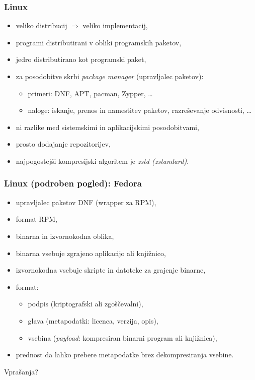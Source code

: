 \documentclass[aspectratio=169]{beamer}
\begin{document}
    \begin{frame}
        \frametitle{Linux}
        \begin{itemize}
            \item veliko distribucij \( \Rightarrow \) veliko implementacij,
            \item programi distributirani v obliki programskih paketov,
            \item jedro distributirano kot programski paket,
            \item za posodobitve skrbi \emph{package manager} (upravljalec paketov):
            \begin{itemize}
                \item primeri: DNF, APT, pacman, Zypper, \ldots
                \item naloge: iskanje, prenos in namestitev paketov, razreševanje odvisnosti, \ldots
            \end{itemize}
            \item ni razlike med sistemskimi in aplikacijskimi posodobitvami,
            \item prosto dodajanje repozitorijev,
            \item najpogostejši kompresijski algoritem je \emph{zstd (zstandard)}.
        \end{itemize}
    \end{frame}

    \begin{frame}
        \frametitle{Linux (podroben pogled): Fedora}
        \begin{itemize}
            \item upravljalec paketov DNF (wrapper za RPM),
            \item format RPM,
            \item binarna in izvornokodna oblika,
            \item binarna vsebuje zgrajeno aplikacijo ali knjižnico,
            \item izvornokodna vsebuje skripte in datoteke za grajenje binarne,
            \item format:
            \begin{itemize}
                \item podpis (kriptografski ali zgoščevalni),
                \item glava (metapodatki: licenca, verzija, opis),
                \item vsebina (\emph{payload}: kompresiran binarni program ali knjižnica),
            \end{itemize}
            \item prednost da lahko prebere metapodatke brez dekompresiranja vsebine.
        \end{itemize}
    \end{frame}

    \begin{frame}[plain,c]
       \begin{center}
            Vprašanja?
       \end{center}
    \end{frame}
\end{document}
